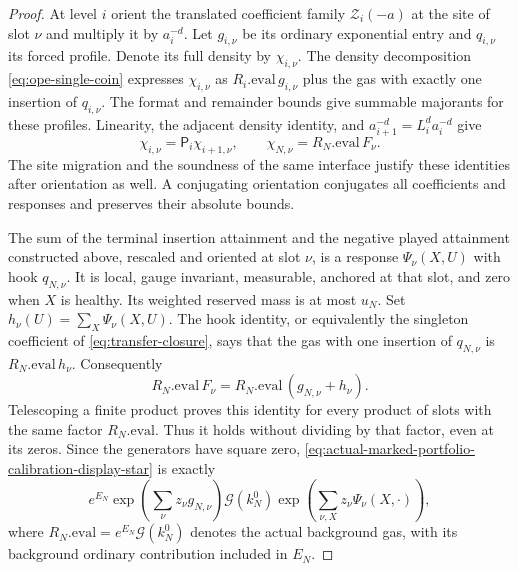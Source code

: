 \begin{proof}
At level $i$ orient the translated coefficient family $\mathcal Z_i(-a)$ at the
site of slot $\nu$ and multiply it by $a_i^{-d}$. Let $g_{i,\nu}$ be
its ordinary exponential entry and $q_{i,\nu}$ its forced profile.
Denote its full density by $\chi_{i,\nu}$. The density decomposition
\eqref{eq:ope-single-coin} expresses $\chi_{i,\nu}$ as
$R_i.\mathrm{eval}\,g_{i,\nu}$ plus the gas with exactly one insertion
of $q_{i,\nu}$. The format and remainder bounds give summable majorants
for these profiles. Linearity, the adjacent density identity, and
$a_{i+1}^{-d}=L_i^d a_i^{-d}$ give
\[
 \chi_{i,\nu}=\mathsf P_i\chi_{i+1,\nu},\qquad
 \chi_{N,\nu}=R_N.\mathrm{eval}\,F_\nu.
\]
The site migration and the soundness of the same interface justify these
identities after orientation as well. A conjugating orientation conjugates
all coefficients and responses and preserves their absolute bounds.

The sum of the terminal insertion attainment and the negative played attainment
constructed above, rescaled and oriented at slot $\nu$, is a response
$\Psi_\nu(X,U)$ with hook $q_{N,\nu}$. It is local, gauge invariant,
measurable, anchored at that slot, and zero when $X$ is healthy. Its
weighted reserved mass is at most $u_N$. Set
$h_\nu(U)=\sum_X\Psi_\nu(X,U)$. The hook identity, or equivalently the
singleton coefficient of \eqref{eq:transfer-closure}, says that the gas
with one insertion of $q_{N,\nu}$ is
$R_N.\mathrm{eval}\,h_\nu$. Consequently
\[
 R_N.\mathrm{eval}\,F_\nu
   =R_N.\mathrm{eval}\,(g_{N,\nu}+h_\nu).
\]
Telescoping a finite product proves this identity for every product of
slots with the same factor $R_N.\mathrm{eval}$. Thus it holds without
dividing by that factor, even at its zeros. Since the generators have
square zero, \eqref{eq:actual-marked-portfolio-calibration-display-star} is exactly
\begin{equation}
 e^{E_N}\exp\!\left(\sum_\nu z_\nu g_{N,\nu}\right)
 \mathcal G(k_N^0)
 \exp\!\left(\sum_{\nu,X}z_\nu\Psi_\nu(X,\cdot)\right),
 \label{eq:actual-marked-portfolio-calibration-display-double-star}
\end{equation}
where $R_N.\mathrm{eval}=e^{E_N}\mathcal G(k_N^0)$ denotes the actual
background gas, with its background ordinary contribution included in
$E_N$.


\end{proof}
